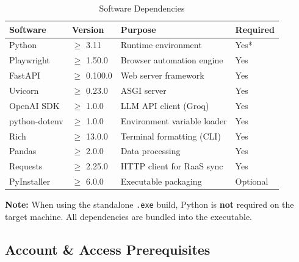\documentclass[12pt,a4paper]{article}
\begin{document}
\begin{table}[H]
\centering
\caption{Software Dependencies}
\label{tab:software-dependencies}
\begin{tabularx}{\textwidth}{l l X l}
\toprule
\textbf{Software} & \textbf{Version} & \textbf{Purpose} & \textbf{Required} \\
\midrule
Python & $\geq$ 3.11 & Runtime environment & Yes* \\
Playwright & $\geq$ 1.50.0 & Browser automation engine & Yes \\
FastAPI & $\geq$ 0.100.0 & Web server framework & Yes \\
Uvicorn & $\geq$ 0.23.0 & ASGI server & Yes \\
OpenAI SDK & $\geq$ 1.0.0 & LLM API client (Groq) & Yes \\
python-dotenv & $\geq$ 1.0.0 & Environment variable loader & Yes \\
Rich & $\geq$ 13.0.0 & Terminal formatting (CLI) & Yes \\
Pandas & $\geq$ 2.0.0 & Data processing & Yes \\
Requests & $\geq$ 2.25.0 & HTTP client for RaaS sync & Yes \\
PyInstaller & $\geq$ 6.0.0 & Executable packaging & Optional \\
\bottomrule
\end{tabularx}
\end{table}

\begin{infobox}
\textbf{Note:} When using the standalone \texttt{.exe} build, Python is \textbf{not} required on the target machine. All dependencies are bundled into the executable.
\end{infobox}

\subsection{Account \& Access Prerequisites}
\label{subsec:account-prerequisites}
\end{document}
